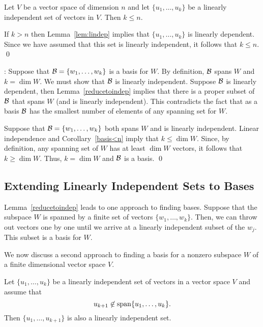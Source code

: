 \begin{cor}  \label{basis<n}
Let $V$ be a vector space of dimension $n$ and let $\{u_1,\ldots,u_k\}$ be a 
linearly independent set of vectors in $V$.  Then $k\le n$.
\end{cor} 

\proof If $k>n$ then Lemma~\ref{lem:lindep} implies that
$\{u_1,\ldots,u_k\}$ is linearly dependent.  Since we have
assumed that this set is linearly independent, it follows that
$k\leq n$. \qed

\vspace{0.1in}

:
Suppose that ${\cal B}=\{w_1,\ldots,w_k\}$ is a basis for $W$.
By definition, ${\cal B}$ spans $W$ and $k=\dim W$.  We must
show that ${\cal B}$ is linearly independent.  Suppose ${\cal B}$
is linearly dependent, then Lemma~\ref{reducetoindep} implies
that there is a proper subset of ${\cal B}$ that spans $W$ (and
is linearly independent). This contradicts the fact that as a
basis ${\cal B}$ has the smallest number of elements of any
spanning set for $W$.

Suppose that ${\cal B}=\{w_1,\ldots,w_k\}$ both spans $W$ and is
linearly independent.  Linear independence and Corollary~\ref{basis<n}
imply that $k\leq\dim W$.  Since, by definition, any spanning set
of $W$ has at least $\dim W$ vectors, it follows that $k\geq\dim W$.
Thus, $k = \dim W$ and  ${\cal B}$ is a basis.   \qed

\subsection*{Extending Linearly Independent Sets to Bases} 

Lemma~\ref{reducetoindep} leads to one approach to finding
bases.  Suppose that the subspace $W$ is spanned by a finite
set of vectors $\{w_1,\ldots,w_k\}$.  Then, we can throw out
vectors one by one until we arrive at a linearly independent
subset of the $w_j$.  This subset is a basis for $W$.

We now discuss a second approach to finding a basis for a
nonzero subspace $W$ of a finite dimensional vector space $V$.

\begin{lemma}  \label{extendindep}
Let $\{u_1,\ldots,u_k\}$ be a linearly independent set of
vectors in a vector space $V$ and assume that
\[
u_{k+1}\not\in{\rm span}\{u_1,\ldots,u_k\}.
\]
Then $\{u_1,\ldots,u_{k+1}\}$ is also a linearly independent
set.
\end{lemma} 

